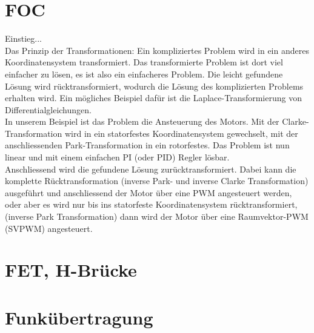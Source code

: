 \section{FOC}
\label{tGl_FOC}
Einstieg...\\
Das Prinzip der Transformationen:
Ein kompliziertes Problem wird in ein anderes Koordinatensystem transformiert. Das transformierte Problem ist dort viel einfacher zu lösen, es ist also ein einfacheres Problem. Die leicht gefundene Lösung wird rücktransformiert, wodurch die Lösung des komplizierten Problems erhalten wird. Ein mögliches Beispiel dafür ist die Laplace-Transformierung von Differentialgleichungen. 
\\
In unserem Beispiel ist das Problem die Ansteuerung des Motors. Mit der Clarke-Transformation wird in ein statorfestes Koordinatensystem gewechselt, mit der anschliessenden Park-Transformation in ein rotorfestes. Das Problem ist nun linear und mit einem einfachen PI (oder PID) Regler lösbar. \\
Anschliessend wird die gefundene Lösung zurücktransformiert.
Dabei kann die komplette Rücktransformation (inverse Park- und inverse Clarke Transformation) ausgeführt und anschliessend der Motor über eine PWM angesteuert werden, oder aber es wird nur bis ins statorfeste Koordinatensystem rücktransformiert, (inverse Park Transformation) dann wird der Motor über eine Raumvektor-PWM (SVPWM) angesteuert.


\section{FET, H-Brücke}
\label{tGl_HBrugg}
\section{Funkübertragung}
\label{tGl_RF}
